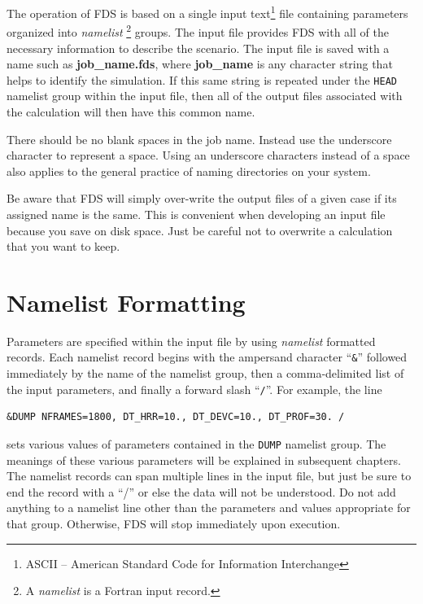 \documentclass[11pt]{book}
\newcommand{\ct}{\tt\small}
\begin{document}
The operation of FDS is based on a single input text\footnote{ASCII -- American Standard Code
for Information Interchange} file containing parameters organized into {\em namelist}
\footnote{A {\em namelist} is a Fortran input record.} groups. 
The input file provides FDS  with all of the necessary information to
describe the scenario.
The input file is saved with a name such as {\bf job\_name.fds},
where {\bf job\_name} is any character string that helps to identify
the simulation. If this same string is repeated under the {\ct HEAD} namelist group within the
input file, then all of the output files associated with the calculation will then have this common name.

There should be no blank spaces in the job name. Instead use the underscore
character to represent a space.  Using an underscore characters instead of a space also applies
to the general practice of naming directories on your system.

Be aware that FDS will simply over-write the output files of a given case if its assigned
name is the same. This is convenient when developing an input file because you save on disk space. Just be careful
not to overwrite a calculation that you want to keep.



\section{Namelist Formatting}

\noindent
Parameters are specified within the input file by using {\em namelist} formatted records.
Each namelist record begins with the ampersand character ``{\ct \&}'' followed
immediately by the name of the namelist group, then a comma-delimited list of the input parameters, and
finally a forward slash ``{\ct /}''. For example, the line

\footnotesize
\begin{verbatim}
&DUMP NFRAMES=1800, DT_HRR=10., DT_DEVC=10., DT_PROF=30. /
\end{verbatim}

\normalsize \noindent
sets various values of parameters contained in the {\ct DUMP} namelist group. The meanings of these various parameters will
be explained in subsequent chapters. The namelist records can span multiple lines in the input file, but just be sure to
end the record with a ``/'' or else the data will not be understood. Do not add anything to a namelist line other than the
parameters and values appropriate for that group. Otherwise, FDS will stop immediately upon execution.
\end{document}

